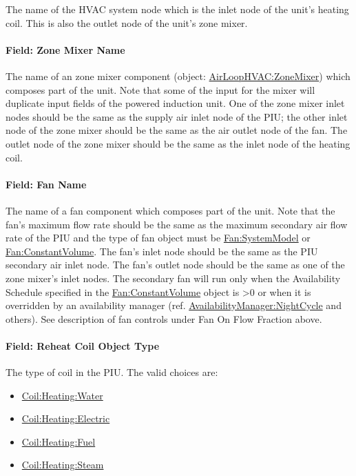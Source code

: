 The name of the HVAC system node which is the inlet node of the unit's heating coil. This is also the outlet node of the unit's zone mixer.

\paragraph{Field: Zone Mixer Name}\label{field-zone-mixer-name-1}

The name of an zone mixer component (object: \hyperref[airloophvaczonemixer]{AirLoopHVAC:ZoneMixer}) which composes part of the unit. Note that some of the input for the mixer will duplicate input fields of the powered induction unit. One of the zone mixer inlet nodes should be the same as the supply air inlet node of the PIU; the other inlet node of the zone mixer should be the same as the air outlet node of the fan. The outlet node of the zone mixer should be the same as the inlet node of the heating coil.

\paragraph{Field: Fan Name}\label{field-fan-name-2}

The name of a fan component which composes part of the unit. Note that the fan's maximum flow rate should be the same as the maximum secondary air flow rate of the PIU and the type of fan object must be \hyperref[fansystemmodel]{Fan:SystemModel} or \hyperref[fanconstantvolume]{Fan:ConstantVolume}. The fan's inlet node should be the same as the PIU secondary air inlet node. The fan's outlet node should be the same as one of the zone mixer's inlet nodes. The secondary fan will run only when the Availability Schedule specified in the \hyperref[fanconstantvolume]{Fan:ConstantVolume} object is >0 or when it is overridden by an availability manager (ref. \hyperref[availabilitymanagernightcycle]{AvailabilityManager:NightCycle} and others). See description of fan controls under Fan On Flow Fraction above.

\paragraph{Field: Reheat Coil Object Type}\label{field-reheat-coil-object-type-4}

The type of coil in the PIU. The valid choices are:

\begin{itemize}
\item
  \hyperref[coilheatingwater]{Coil:Heating:Water}
\item
  \hyperref[coilheatingelectric]{Coil:Heating:Electric}
\item
  \hyperref[coilheatinggas-000]{Coil:Heating:Fuel}
\item
  \hyperref[coilheatingsteam]{Coil:Heating:Steam}
\end{itemize}

